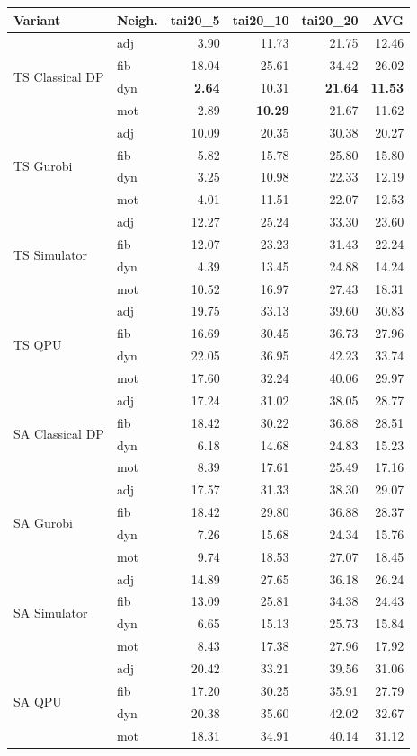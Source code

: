 \setlength{\tabcolsep}{3pt}
\begin{tabular}{@{}ll rrrr@{}}
\textbf{Variant} & \textbf{Neigh.} & tai20\_5 & tai20\_10 & tai20\_20 & \textbf{AVG} \\
\hline
\multirow{4}{*}{TS Classical DP} & adj & 3.90 & 11.73 & 21.75 & 12.46 \\
 & fib & 18.04 & 25.61 & 34.42 & 26.02 \\
 & dyn & {\bfseries 2.64} & 10.31 & {\bfseries 21.64} & {\bfseries 11.53} \\
 & mot & 2.89 & {\bfseries 10.29} & 21.67 & 11.62 \\
\hline
\multirow{4}{*}{TS Gurobi} & adj & 10.09 & 20.35 & 30.38 & 20.27 \\
 & fib & 5.82 & 15.78 & 25.80 & 15.80 \\
 & dyn & 3.25 & 10.98 & 22.33 & 12.19 \\
 & mot & 4.01 & 11.51 & 22.07 & 12.53 \\
\hline
\multirow{4}{*}{TS Simulator} & adj & 12.27 & 25.24 & 33.30 & 23.60 \\
 & fib & 12.07 & 23.23 & 31.43 & 22.24 \\
 & dyn & 4.39 & 13.45 & 24.88 & 14.24 \\
 & mot & 10.52 & 16.97 & 27.43 & 18.31 \\
\hline
\multirow{4}{*}{TS QPU} & adj & 19.75 & 33.13 & 39.60 & 30.83 \\
 & fib & 16.69 & 30.45 & 36.73 & 27.96 \\
 & dyn & 22.05 & 36.95 & 42.23 & 33.74 \\
 & mot & 17.60 & 32.24 & 40.06 & 29.97 \\
\hline
\multirow{4}{*}{SA Classical DP} & adj & 17.24 & 31.02 & 38.05 & 28.77 \\
 & fib & 18.42 & 30.22 & 36.88 & 28.51 \\
 & dyn & 6.18 & 14.68 & 24.83 & 15.23 \\
 & mot & 8.39 & 17.61 & 25.49 & 17.16 \\
\hline
\multirow{4}{*}{SA Gurobi} & adj & 17.57 & 31.33 & 38.30 & 29.07 \\
 & fib & 18.42 & 29.80 & 36.88 & 28.37 \\
 & dyn & 7.26 & 15.68 & 24.34 & 15.76 \\
 & mot & 9.74 & 18.53 & 27.07 & 18.45 \\
\hline
\multirow{4}{*}{SA Simulator} & adj & 14.89 & 27.65 & 36.18 & 26.24 \\
 & fib & 13.09 & 25.81 & 34.38 & 24.43 \\
 & dyn & 6.65 & 15.13 & 25.73 & 15.84 \\
 & mot & 8.43 & 17.38 & 27.96 & 17.92 \\
\hline
\multirow{4}{*}{SA QPU} & adj & 20.42 & 33.21 & 39.56 & 31.06 \\
 & fib & 17.20 & 30.25 & 35.91 & 27.79 \\
 & dyn & 20.38 & 35.60 & 42.02 & 32.67 \\
 & mot & 18.31 & 34.91 & 40.14 & 31.12 \\
\hline
\end{tabular}
